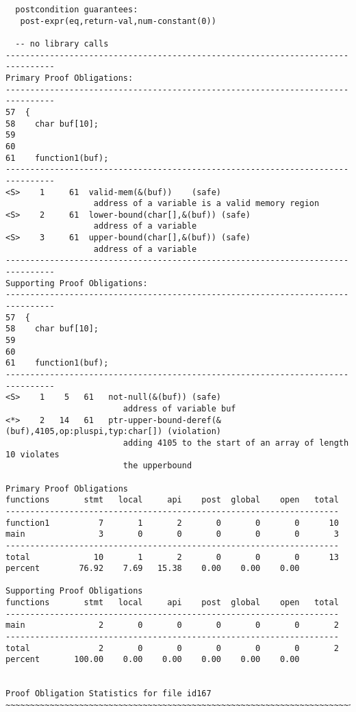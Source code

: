 \documentclass[11pt]{article}
\begin{document}
\begin{small}
\begin{verbatim}
  postcondition guarantees:
   post-expr(eq,return-val,num-constant(0))

  -- no library calls
--------------------------------------------------------------------------------
Primary Proof Obligations:
--------------------------------------------------------------------------------
57  {
58    char buf[10];
59
60
61    function1(buf);
--------------------------------------------------------------------------------
<S>    1     61  valid-mem(&(buf))    (safe)
                  address of a variable is a valid memory region
<S>    2     61  lower-bound(char[],&(buf)) (safe)
                  address of a variable
<S>    3     61  upper-bound(char[],&(buf)) (safe)
                  address of a variable
--------------------------------------------------------------------------------
Supporting Proof Obligations:
--------------------------------------------------------------------------------
57  {
58    char buf[10];
59
60
61    function1(buf);
--------------------------------------------------------------------------------
<S>    1    5   61   not-null(&(buf)) (safe)
                        address of variable buf
<*>    2   14   61   ptr-upper-bound-deref(&(buf),4105,op:pluspi,typ:char[]) (violation)
                        adding 4105 to the start of an array of length 10 violates 
                        the upperbound

Primary Proof Obligations
functions       stmt   local     api    post  global    open   total
--------------------------------------------------------------------
function1          7       1       2       0       0       0      10
main               3       0       0       0       0       0       3
--------------------------------------------------------------------
total             10       1       2       0       0       0      13
percent        76.92    7.69   15.38    0.00    0.00    0.00

Supporting Proof Obligations
functions       stmt   local     api    post  global    open   total
--------------------------------------------------------------------
main               2       0       0       0       0       0       2
--------------------------------------------------------------------
total              2       0       0       0       0       0       2
percent       100.00    0.00    0.00    0.00    0.00    0.00


Proof Obligation Statistics for file id167
~~~~~~~~~~~~~~~~~~~~~~~~~~~~~~~~~~~~~~~~~~~~~~~~~~~~~~~~~~~~~~~~~~~~~~~~~~~~~~~~


\end{verbatim}
\end{small}
\end{document}
